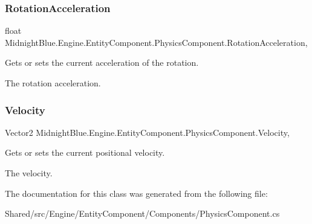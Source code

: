 \subsubsection{\texorpdfstring{Rotation\+Acceleration}{RotationAcceleration}}
{\footnotesize\ttfamily float Midnight\+Blue.\+Engine.\+Entity\+Component.\+Physics\+Component.\+Rotation\+Acceleration\hspace{0.3cm}{\ttfamily [get]}, {\ttfamily [set]}}



Gets or sets the current acceleration of the rotation. 

The rotation acceleration.\hypertarget{class_midnight_blue_1_1_engine_1_1_entity_component_1_1_physics_component_ab6c31525424cbc7cbcc42fc5264d0ef9}{}\label{class_midnight_blue_1_1_engine_1_1_entity_component_1_1_physics_component_ab6c31525424cbc7cbcc42fc5264d0ef9} 
\subsubsection{\texorpdfstring{Velocity}{Velocity}}
{\footnotesize\ttfamily Vector2 Midnight\+Blue.\+Engine.\+Entity\+Component.\+Physics\+Component.\+Velocity\hspace{0.3cm}{\ttfamily [get]}, {\ttfamily [set]}}



Gets or sets the current positional velocity. 

The velocity.

The documentation for this class was generated from the following file\+:\begin{DoxyCompactItemize}
\item 
Shared/src/\+Engine/\+Entity\+Component/\+Components/Physics\+Component.\+cs\end{DoxyCompactItemize}
